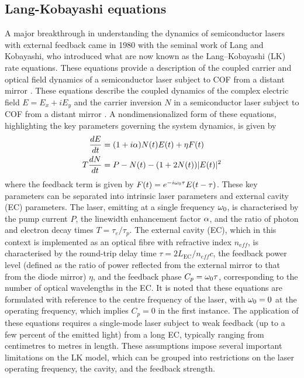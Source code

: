 \subsection*{Lang-Kobayashi equations}
A major breakthrough in understanding the dynamics of semiconductor lasers with external feedback came in 1980 with the seminal work of Lang and Kobayashi, who introduced what are now known as the Lang–Kobayashi (LK) rate equations.
These equations provide a description of the coupled carrier and optical field dynamics of a semiconductor laser subject to COF from a distant mirror \cite{lang1980external}.
These equations describe the coupled dynamics of the complex electric field $E = E_x + iE_y$ and the carrier inversion $N$ in a semiconductor laser subject to COF from a distant mirror \cite{lang1980external}.
A nondimensionalized form of these equations, highlighting the key parameters governing the system dynamics, is given by \cite{heil2003delay}
%
\begin{equation}
\label{eq:LK}
    \begin{aligned}
        \frac{d E}{d t} & =(1+i \alpha) N(t) E(t)+\eta F(t) \\
        T \frac{d N}{d t} & =P-N(t)-(1+2 N(t))|E(t)|^2
    \end{aligned}
\end{equation}
%
where the feedback term is given by $F(t) = e^{-i \omega_0 \tau} E(t-\tau)$.
These key parameters can be separated into intrinsic laser parameters and external cavity (EC) parameters.
The laser, emitting at a single frequency $\omega_0$, is characterised by the pump current $P$, the linewidth enhancement factor $\alpha$, and the ratio of photon and electron decay times $T = \tau_e/\tau_p$.
The external cavity (EC), which in this context is implemented as an optical fibre with refractive index $n_{eff}$, is characterised by the round-trip delay time $\tau = 2L_\text{EC}/n_{eff} c$, the feedback power level (defined as the ratio of power reflected from the external mirror to that from the diode mirror) $\eta$, and the feedback phase $C_p = \omega_0 \tau$, corresponding to the number of optical wavelengths in the EC.
It is noted that these equations are formulated with reference to the centre frequency of the laser, with $\omega_0 = 0$ at the operating frequency, which implies $C_p = 0$ in the first instance.
The application of these equations requires a single-mode laser subject to weak feedback (up to a few percent of the emitted light) from a long EC, typically ranging from centimetres to metres in length.
These assumptions impose several important limitations on the LK model, which can be grouped into restrictions on the laser operating frequency, the cavity, and the feedback strength.
